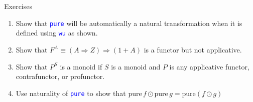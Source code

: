\documentclass[english]{beamer}
\begin{document}
\begin{frame}{Exercises}
\begin{enumerate}
\item Show that \texttt{\textcolor{blue}{\footnotesize{}pure}} will be automatically
a natural transformation when it is defined using \texttt{\textcolor{blue}{\footnotesize{}wu}}
as shown.
\item Show that $F^{A}\equiv\left(A\Rightarrow Z\right)\Rightarrow\left(1+A\right)$
is a functor but not applicative.
\item Show that $P^{S}$ is a monoid if $S$ is a monoid and $P$ is any
applicative functor, contrafunctor, or profunctor.
\item Use naturality of \texttt{\textcolor{blue}{\footnotesize{}pure}} to
show that $\text{pure}\,f\odot\text{pure}\,g=\text{pure}\left(f\odot g\right)$
\end{enumerate}
\end{frame}
\end{document}
